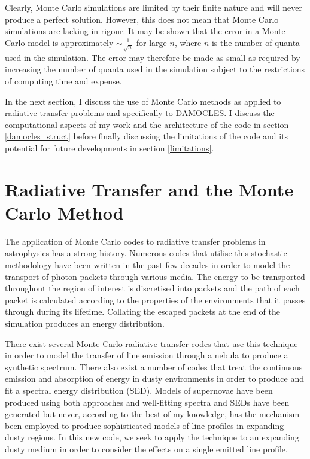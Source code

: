 	 Clearly, Monte Carlo simulations are limited by their finite nature and will never produce a perfect solution.  However, this does not mean that Monte Carlo simulations are lacking in rigour.  It may be shown that the error in a Monte Carlo model is approximately $\sim \frac{1}{\sqrt{n}}$ for large $n$, where $n$ is the number of quanta used in the simulation.  The error may therefore be made as small as required by increasing the number of quanta used in the simulation subject to the restrictions of computing time and expense.
	 
	 In the next section, I discuss the use of Monte Carlo methods as applied to radiative transfer problems and  specifically to DAMOCLES.  I discuss the computational aspects of my work and the architecture of the code in section \ref{damocles_struct} before finally discussing the limitations of the code and its potential for future developments in section \ref{limitations}.
	 
\section{Radiative Transfer and the Monte Carlo Method}
\label{rt}

 The application of Monte Carlo codes to radiative transfer problems in astrophysics has a strong history.  Numerous codes that utilise this stochastic methodology have been written in the past few decades in order to model the transport of photon packets through various media.  The energy to be transported throughout the region of interest is discretised into packets and the path of each packet is calculated according to the properties of the environments that it passes through during its lifetime.  Collating the escaped packets at the end of the simulation produces an energy distribution. 

There exist several Monte Carlo radiative transfer codes that use this technique in order to model the transfer of line emission through a nebula to produce a synthetic spectrum. There also exist a number of codes that treat the continuous emission and absorption of energy in dusty environments in order to produce and fit a spectral energy distribution (SED).  Models of supernovae have been produced using both approaches and well-fitting spectra and SEDs have been generated but never, according to the best of my knowledge, has the mechanism been employed to produce sophisticated models of line profiles in expanding dusty regions.  In this new code, we seek to apply the technique to an expanding dusty medium in order to consider the effects on a single emitted line profile.

